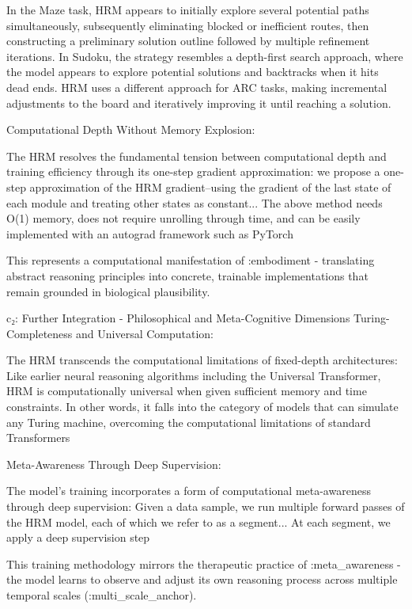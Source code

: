 In the Maze task, HRM appears to initially explore several potential paths simultaneously, subsequently eliminating blocked or inefficient routes, then constructing a preliminary solution outline followed by multiple refinement iterations. In Sudoku, the strategy resembles a depth-first search approach, where the model appears to explore potential solutions and backtracks when it hits dead ends. HRM uses a different approach for ARC tasks, making incremental adjustments to the board and iteratively improving it until reaching a solution.

Computational Depth Without Memory Explosion:

The HRM resolves the fundamental tension between computational depth and training efficiency through its one-step gradient approximation: we propose a one-step approximation of the HRM gradient–using the gradient of the last state of each module and treating other states as constant... The above method needs O(1) memory, does not require unrolling through time, and can be easily implemented with an autograd framework such as PyTorch

This represents a computational manifestation of :embodiment - translating abstract reasoning principles into concrete, trainable implementations that remain grounded in biological plausibility.

c₂: Further Integration - Philosophical and Meta-Cognitive Dimensions
Turing-Completeness and Universal Computation:

The HRM transcends the computational limitations of fixed-depth architectures: Like earlier neural reasoning algorithms including the Universal Transformer, HRM is computationally universal when given sufficient memory and time constraints. In other words, it falls into the category of models that can simulate any Turing machine, overcoming the computational limitations of standard Transformers

Meta-Awareness Through Deep Supervision:

The model's training incorporates a form of computational meta-awareness through deep supervision: Given a data sample, we run multiple forward passes of the HRM model, each of which we refer to as a segment... At each segment, we apply a deep supervision step

This training methodology mirrors the therapeutic practice of :meta_awareness - the model learns to observe and adjust its own reasoning process across multiple temporal scales (:multi_scale_anchor).

